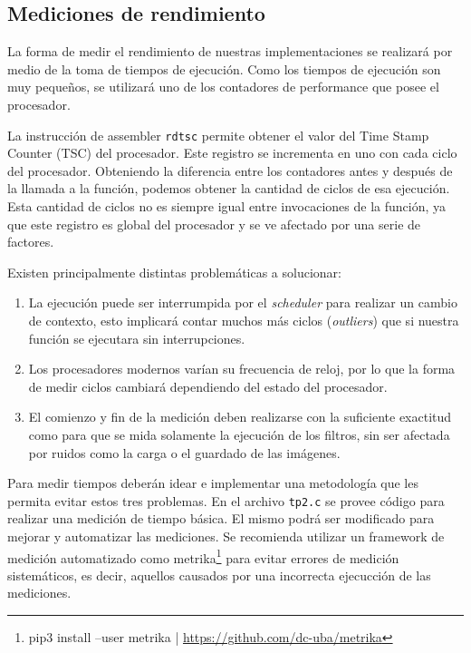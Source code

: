 \documentclass[a4paper, 12pt]{article}
\newcommand{\code}[1]{{\sffamily #1}\xspace}
\begin{document}
\subsection{Mediciones de rendimiento}

La forma de medir el rendimiento de nuestras implementaciones se realizará por medio de la toma de tiempos de ejecución.
Como los tiempos de ejecución son muy pequeños, se utilizará uno de los contadores de performance que posee el procesador.

La instrucción de assembler \texttt{rdtsc} permite obtener el valor del Time Stamp Counter (TSC) del procesador.
Este registro se incrementa en uno con cada ciclo del procesador.
Obteniendo la diferencia entre los contadores antes y después de la llamada a la función, podemos obtener la cantidad de ciclos de esa ejecución.
Esta cantidad de ciclos no es siempre igual entre invocaciones de la función, ya que este registro es global del procesador y se ve afectado por una serie de factores.

Existen principalmente distintas problemáticas a solucionar:

\begin{enumerate}
 \item La ejecución puede ser interrumpida por el \emph{scheduler} para realizar un cambio de contexto, esto implicará contar muchos más ciclos (\emph{outliers}) que si nuestra función se ejecutara sin interrupciones.
 \item Los procesadores modernos varían su frecuencia de reloj, por lo que la forma de medir ciclos cambiará dependiendo del estado del procesador.
 \item El comienzo y fin de la medición deben realizarse con la suficiente
 exactitud como para que se mida solamente la ejecución de los filtros, sin
 ser afectada por ruidos como la carga o el guardado de las imágenes.
\end{enumerate}

Para medir tiempos deberán idear e implementar una metodología que les permita evitar estos tres problemas.
En el archivo \texttt{tp2.c} se provee código para realizar una
medición de tiempo básica. El mismo podrá ser modificado para
mejorar y automatizar las mediciones.
Se recomienda utilizar un framework de medición automatizado
como \code{metrika}\footnote{pip3 install --user metrika |
\url{https://github.com/dc-uba/metrika}}
para evitar errores de medición sistemáticos, es decir, aquellos
causados por una incorrecta ejecucción de las mediciones.
\end{document}
